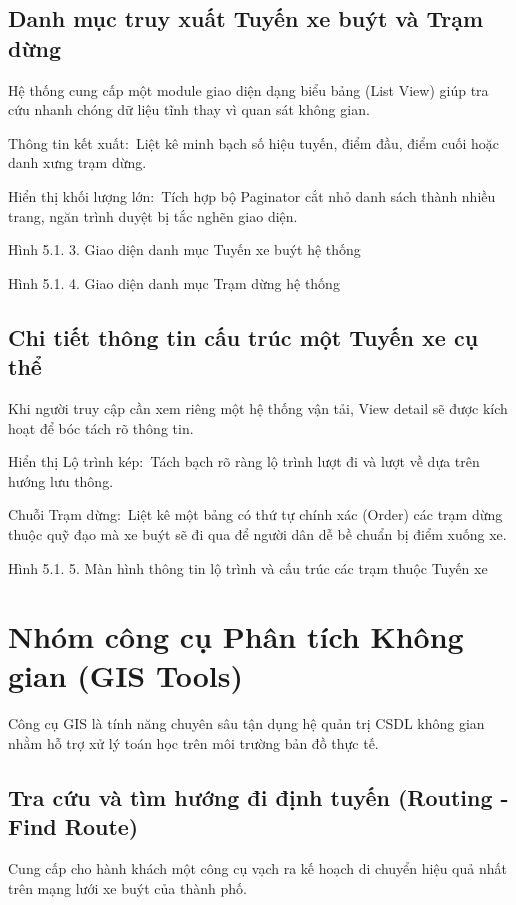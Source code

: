 \documentclass[13pt,a4paper]{report}
\begin{document}
\subsection{Danh mục truy xuất Tuyến xe buýt và Trạm dừng}

Hệ thống cung cấp một module giao diện dạng biểu bảng (List View) giúp tra cứu nhanh chóng dữ liệu tĩnh thay vì quan sát không gian.

Thông tin kết xuất: Liệt kê minh bạch số hiệu tuyến, điểm đầu, điểm cuối hoặc danh xưng trạm dừng.

Hiển thị khối lượng lớn: Tích hợp bộ Paginator cắt nhỏ danh sách thành nhiều trang, ngăn trình duyệt bị tắc nghẽn giao diện.

Hình 5.1. 3. Giao diện danh mục Tuyến xe buýt hệ thống

Hình 5.1. 4. Giao diện danh mục Trạm dừng  hệ thống

\subsection{Chi tiết thông tin cấu trúc một Tuyến xe cụ thể}

Khi người truy cập cần xem riêng một hệ thống vận tải, View detail sẽ được kích hoạt để bóc tách rõ thông tin.

Hiển thị Lộ trình kép: Tách bạch rõ ràng lộ trình lượt đi và lượt về dựa trên hướng lưu thông.

Chuỗi Trạm dừng: Liệt kê một bảng có thứ tự chính xác (Order) các trạm dừng thuộc quỹ đạo mà xe buýt sẽ đi qua để người dân dễ bề chuẩn bị điểm xuống xe.

Hình 5.1. 5. Màn hình thông tin lộ trình và cấu trúc các trạm thuộc Tuyến xe

\section{Nhóm công cụ Phân tích Không gian (GIS Tools)}

Công cụ GIS là tính năng chuyên sâu tận dụng hệ quản trị CSDL không gian nhằm hỗ trợ xử lý toán học trên môi trường bản đồ thực tế.

\subsection{Tra cứu và tìm hướng đi định tuyến (Routing - Find Route)}

Cung cấp cho hành khách một công cụ vạch ra kế hoạch di chuyển hiệu quả nhất trên mạng lưới xe buýt của thành phố.
\end{document}
